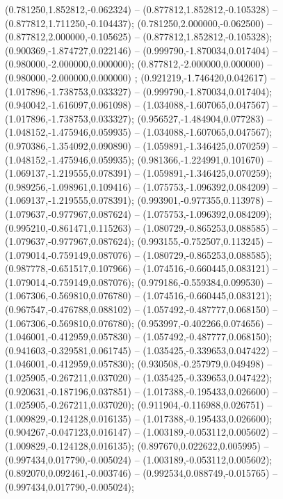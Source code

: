  (0.781250,1.852812,-0.062324) -- (0.877812,1.852812,-0.105328) -- (0.877812,1.711250,-0.104437);
 (0.781250,2.000000,-0.062500) -- (0.877812,2.000000,-0.105625) -- (0.877812,1.852812,-0.105328);
 (0.900369,-1.874727,0.022146) -- (0.999790,-1.870034,0.017404) -- (0.980000,-2.000000,0.000000);
 (0.877812,-2.000000,0.000000) -- (0.980000,-2.000000,0.000000) ;
 (0.921219,-1.746420,0.042617) -- (1.017896,-1.738753,0.033327) -- (0.999790,-1.870034,0.017404);
 (0.940042,-1.616097,0.061098) -- (1.034088,-1.607065,0.047567) -- (1.017896,-1.738753,0.033327);
 (0.956527,-1.484904,0.077283) -- (1.048152,-1.475946,0.059935) -- (1.034088,-1.607065,0.047567);
 (0.970386,-1.354092,0.090890) -- (1.059891,-1.346425,0.070259) -- (1.048152,-1.475946,0.059935);
 (0.981366,-1.224991,0.101670) -- (1.069137,-1.219555,0.078391) -- (1.059891,-1.346425,0.070259);
 (0.989256,-1.098961,0.109416) -- (1.075753,-1.096392,0.084209) -- (1.069137,-1.219555,0.078391);
 (0.993901,-0.977355,0.113978) -- (1.079637,-0.977967,0.087624) -- (1.075753,-1.096392,0.084209);
 (0.995210,-0.861471,0.115263) -- (1.080729,-0.865253,0.088585) -- (1.079637,-0.977967,0.087624);
 (0.993155,-0.752507,0.113245) -- (1.079014,-0.759149,0.087076) -- (1.080729,-0.865253,0.088585);
 (0.987778,-0.651517,0.107966) -- (1.074516,-0.660445,0.083121) -- (1.079014,-0.759149,0.087076);
 (0.979186,-0.559384,0.099530) -- (1.067306,-0.569810,0.076780) -- (1.074516,-0.660445,0.083121);
 (0.967547,-0.476788,0.088102) -- (1.057492,-0.487777,0.068150) -- (1.067306,-0.569810,0.076780);
 (0.953997,-0.402266,0.074656) -- (1.046001,-0.412959,0.057830) -- (1.057492,-0.487777,0.068150);
 (0.941603,-0.329581,0.061745) -- (1.035425,-0.339653,0.047422) -- (1.046001,-0.412959,0.057830);
 (0.930508,-0.257979,0.049498) -- (1.025905,-0.267211,0.037020) -- (1.035425,-0.339653,0.047422);
 (0.920631,-0.187196,0.037851) -- (1.017388,-0.195433,0.026600) -- (1.025905,-0.267211,0.037020);
 (0.911904,-0.116988,0.026751) -- (1.009829,-0.124128,0.016135) -- (1.017388,-0.195433,0.026600);
 (0.904267,-0.047123,0.016147) -- (1.003189,-0.053112,0.005602) -- (1.009829,-0.124128,0.016135);
 (0.897670,0.022622,0.005995) -- (0.997434,0.017790,-0.005024) -- (1.003189,-0.053112,0.005602);
 (0.892070,0.092461,-0.003746) -- (0.992534,0.088749,-0.015765) -- (0.997434,0.017790,-0.005024);

